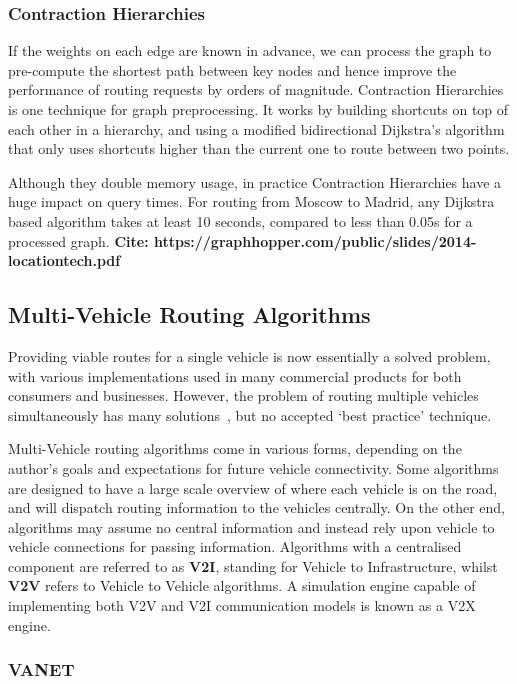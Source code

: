 \documentclass[ %
                    author={Alexander Hill},
                supervisor={Dr. Benjamin Sach},
                    degree={MEng},
                     title={MARMOSET},
                  subtitle={Multi-Agent Route Management using Online Simulation for Efficient Transportation},
                      type={research},
                      year={2016} ]{dissertation}
\begin{document}
\subsubsection{Contraction Hierarchies}

If the weights on each edge are known in advance, we can process the graph to
pre-compute the shortest path between key nodes and hence improve the
performance of routing requests by orders of magnitude. Contraction
Hierarchies~\cite{ch} is one technique for graph preprocessing.  It works by
building shortcuts on top of each other in a hierarchy, and using a modified
bidirectional Dijkstra's algorithm that only uses shortcuts higher than the
current one to route between two points.

Although they double memory usage, in practice Contraction Hierarchies have a
huge impact on query times. For routing from Moscow to Madrid, any Dijkstra
based algorithm takes at least 10 seconds, compared to less than 0.05s for a
processed graph.
\textbf{Cite: https://graphhopper.com/public/slides/2014-locationtech.pdf}

\subsection{Multi-Vehicle Routing Algorithms}

Providing viable routes for a single vehicle is now essentially a solved
problem, with various implementations used in many commercial products for both
consumers and businesses. However, the problem of routing multiple vehicles
simultaneously has many solutions~\cite{beejama,rt:compstudy,rt:decentralized,
rt:guidance,rt:congestion,rt:car,rt:unexpected}, but no accepted `best practice'
technique.

Multi-Vehicle routing algorithms come in various forms, depending on the
author's goals and expectations for future vehicle connectivity. Some algorithms
are designed to have a large scale overview of where each vehicle is on the
road, and will dispatch routing information to the vehicles centrally. On the
other end, algorithms may assume no central information and instead rely upon
vehicle to vehicle connections for passing information. Algorithms with a
centralised component are referred to as \textbf{V2I}, standing for Vehicle to
Infrastructure, whilst \textbf{V2V} refers to Vehicle to Vehicle algorithms. A
simulation engine capable of implementing both V2V and V2I communication models
is known as a V2X engine.

\subsubsection{VANET}
\end{document}
